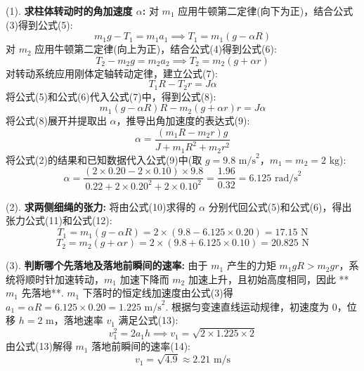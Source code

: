 (1). \textbf{求柱体转动时的角加速度 $\alpha$:}
对 $m_1$ 应用牛顿第二定律(向下为正)，结合公式(3)得到公式(5):
\begin{equation}
	m_1 g - T_1 = m_1 a_1 \implies T_1 = m_1(g - \alpha R)
\end{equation}
对 $m_2$ 应用牛顿第二定律(向上为正)，结合公式(4)得到公式(6):
\begin{equation}
	T_2 - m_2 g = m_2 a_2 \implies T_2 = m_2(g + \alpha r)
\end{equation}
对转动系统应用刚体定轴转动定律，建立公式(7):
\begin{equation}
	T_1 R - T_2 r = J \alpha
\end{equation}
将公式(5)和公式(6)代入公式(7)中，得到公式(8):
\begin{equation}
	m_1(g - \alpha R)R - m_2(g + \alpha r)r = J \alpha
\end{equation}
将公式(8)展开并提取出 $\alpha$，推导出角加速度的表达式(9):
\begin{equation}
	\alpha = \frac{(m_1 R - m_2 r)g}{J + m_1 R^2 + m_2 r^2}
\end{equation}
将公式(2)的结果和已知数据代入公式(9)中(取 $g = 9.8 \text{ m/s}^2$，$m_1 = m_2 = 2 \text{ kg}$):
\begin{equation}
	\alpha = \frac{(2 \times 0.20 - 2 \times 0.10) \times 9.8}{0.22 + 2 \times 0.20^2 + 2 \times 0.10^2} = \frac{1.96}{0.32} = 6.125 \text{ rad/s}^2
\end{equation}

(2). \textbf{求两侧细绳的张力:}
将由公式(10)求得的 $\alpha$ 分别代回公式(5)和公式(6)，得出张力公式(11)和公式(12):
\begin{equation}
	T_1 = m_1(g - \alpha R) = 2 \times (9.8 - 6.125 \times 0.20) = 17.15 \text{ N}
\end{equation}
\begin{equation}
	T_2 = m_2(g + \alpha r) = 2 \times (9.8 + 6.125 \times 0.10) = 20.825 \text{ N}
\end{equation}

(3). \textbf{判断哪个先落地及落地前瞬间的速率:}
由于 $m_1$ 产生的力矩 $m_1 g R > m_2 g r$，系统将顺时针加速转动，$m_1$ 加速下降而 $m_2$ 加速上升，且初始高度相同，因此 **$m_1$ 先落地**.
$m_1$ 下落时的恒定线加速度由公式(3)得 $a_1 = \alpha R = 6.125 \times 0.20 = 1.225 \text{ m/s}^2$.
根据匀变速直线运动规律，初速度为 $0$，位移 $h = 2 \text{ m}$，落地速率 $v_1$ 满足公式(13):
\begin{equation}
	v_1^2 = 2 a_1 h \implies v_1 = \sqrt{2 \times 1.225 \times 2}
\end{equation}
由公式(13)解得 $m_1$ 落地前瞬间的速率(14):
\begin{equation}
	v_1 = \sqrt{4.9} \approx 2.21 \text{ m/s}
\end{equation}

